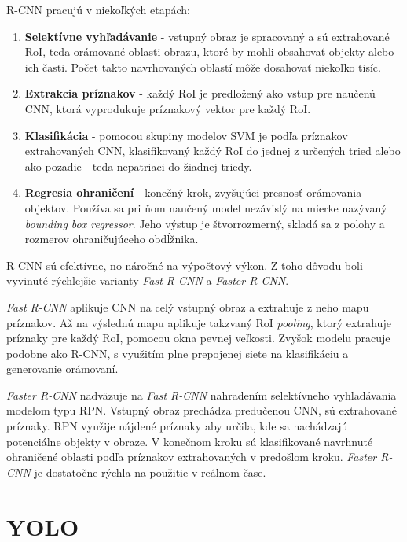        \ac{R-CNN} pracujú v niekoľkých etapách:
        \begin{enumerate}
            \item \textbf{Selektívne vyhľadávanie} - vstupný obraz je spracovaný a sú extrahované \ac{RoI}, teda orámované oblasti obrazu, ktoré by mohli obsahovať objekty alebo ich časti. Počet takto navrhovaných oblastí môže dosahovať niekoľko tisíc.
            \item \textbf{Extrakcia príznakov} - každý \ac{RoI} je predložený ako vstup pre naučenú \ac{CNN}, ktorá vyprodukuje príznakový vektor pre každý \ac{RoI}.
            \item \textbf{Klasifikácia} - pomocou skupiny modelov \ac{SVM} je podľa príznakov extrahovaných \ac{CNN}, klasifikovaný každý \ac{RoI} do jednej z určených tried alebo ako pozadie - teda nepatriaci do žiadnej triedy.
            \item \textbf{Regresia ohraničení} - konečný krok, zvyšujúci presnosť orámovania objektov. Používa sa pri ňom naučený model nezávislý na mierke nazývaný \emph{bounding box regressor}. Jeho výstup je štvorrozmerný, skladá sa z polohy a rozmerov ohraničujúceho obdĺžnika.
        \end{enumerate}

        \ac{R-CNN} sú efektívne, no náročné na výpočtový výkon. Z toho dôvodu boli vyvinuté rýchlejšie varianty \emph{Fast R-CNN} a \emph{Faster R-CNN}.

        \emph{Fast R-CNN} aplikuje \ac{CNN} na celý vstupný obraz a extrahuje z neho mapu príznakov. Až na výslednú mapu aplikuje takzvaný \ac{RoI} \emph{pooling}, ktorý extrahuje príznaky pre každý \ac{RoI}, pomocou okna pevnej veľkosti. Zvyšok modelu pracuje podobne ako \ac{R-CNN}, s využitím plne prepojenej siete na klasifikáciu a generovanie orámovaní.

        \emph{Faster R-CNN} nadväzuje na \emph{Fast R-CNN} nahradením selektívneho vyhľadávania modelom typu \ac{RPN}. Vstupný obraz prechádza predučenou \ac{CNN}, sú extrahované príznaky. \ac{RPN} využije nájdené príznaky aby určila, kde sa nachádzajú potenciálne objekty v obraze. V konečnom kroku sú klasifikované navrhnuté ohraničené oblasti podľa príznakov extrahovaných v predošlom kroku. \emph{Faster R-CNN} je dostatočne rýchla na použitie v reálnom čase.

    \section{YOLO}

